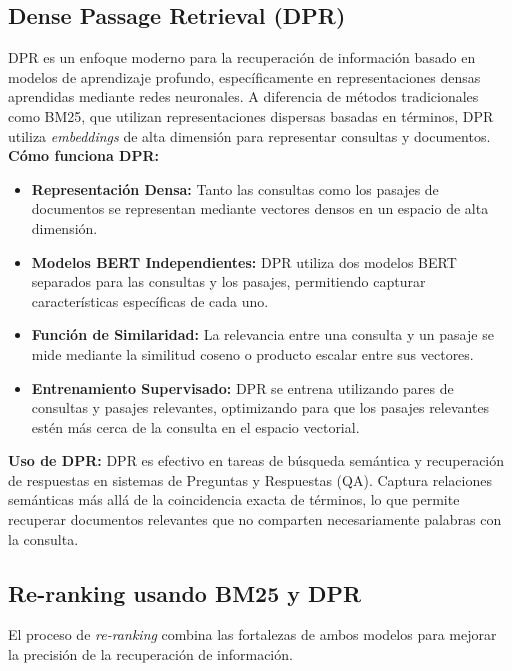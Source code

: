\documentclass[runningheads]{llncs}
\begin{document}
\subsection*{Dense Passage Retrieval (DPR)}
DPR es un enfoque moderno para la recuperación de información basado en modelos de aprendizaje profundo, específicamente en representaciones densas aprendidas mediante redes neuronales. A diferencia de métodos tradicionales como BM25, que utilizan representaciones dispersas basadas en términos, DPR utiliza \emph{embeddings} de alta dimensión para representar consultas y documentos.\\

\textbf{Cómo funciona DPR:}
\begin{itemize}
    \item \textbf{Representación Densa:} Tanto las consultas como los pasajes de documentos se representan mediante vectores densos en un espacio de alta dimensión.
    \item \textbf{Modelos BERT Independientes:} DPR utiliza dos modelos BERT separados para las consultas y los pasajes, permitiendo capturar características específicas de cada uno.
    \item \textbf{Función de Similaridad:} La relevancia entre una consulta y un pasaje se mide mediante la similitud coseno o producto escalar entre sus vectores.
    \item \textbf{Entrenamiento Supervisado:} DPR se entrena utilizando pares de consultas y pasajes relevantes, optimizando para que los pasajes relevantes estén más cerca de la consulta en el espacio vectorial.
\end{itemize}

\textbf{Uso de DPR:}
DPR es efectivo en tareas de búsqueda semántica y recuperación de respuestas en sistemas de Preguntas y Respuestas (QA). Captura relaciones semánticas más allá de la coincidencia exacta de términos, lo que permite recuperar documentos relevantes que no comparten necesariamente palabras con la consulta.

\subsection*{Re-ranking usando BM25 y DPR}
El proceso de \emph{re-ranking} combina las fortalezas de ambos modelos para mejorar la precisión de la recuperación de información.\\
\end{document}
